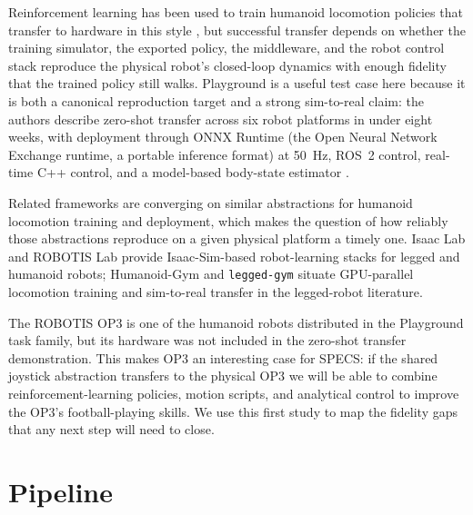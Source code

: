 Reinforcement learning has been used to train humanoid locomotion policies that
transfer to hardware in this style
\citep{Rudin2022-learning-to-walk-in-minutes-massively-parallel-deep-reinforcement-learning,Gu2024-humanoid-gym-reinforcement-learning-humanoid-robot-zero-shot-sim-to-real-transfer,Zakka2025-demonstrating-mujoco-playground},
but successful transfer depends on whether the training simulator, the exported
policy, the middleware, and the robot control stack reproduce the physical
robot's closed-loop dynamics with enough fidelity that the trained policy still
walks. Playground is a useful test case here because it is both a canonical
reproduction target and a strong sim-to-real claim: the authors describe
zero-shot transfer across six robot platforms in under eight weeks, with
deployment through ONNX Runtime (the Open Neural Network Exchange runtime, a
portable inference format) at 50~Hz, ROS~2 control, real-time C++ control, and a
model-based body-state estimator
\citep{Zakka2025-demonstrating-mujoco-playground}.

Related frameworks are converging on similar abstractions for humanoid
locomotion training and deployment, which makes the question of how reliably
those abstractions reproduce on a given physical platform a timely one. Isaac
Lab
\citep{Mittal2025-isaac-lab-gpu-accelerated-simulation-framework-multi-modal-robot-learning}
and ROBOTIS Lab
\citep{ROBOTIS2026-robotis-lab-reinforcement-learning-imitation-learning-robotis-robots}
provide Isaac-Sim-based robot-learning stacks for legged and humanoid robots;
Humanoid-Gym
\citep{Gu2024-humanoid-gym-reinforcement-learning-humanoid-robot-zero-shot-sim-to-real-transfer}
and \texttt{legged-gym}
\citep{Rudin2022-learning-to-walk-in-minutes-massively-parallel-deep-reinforcement-learning}
situate GPU-parallel locomotion training and sim-to-real transfer in the
legged-robot literature.

The ROBOTIS OP3 is one of the humanoid robots distributed in the Playground task
family, but its hardware was not included in the zero-shot transfer demonstration. This
makes OP3 an interesting case for SPECS: if the shared joystick abstraction
transfers to the physical OP3 we will be able to combine
reinforcement-learning policies, motion scripts, and analytical control to
improve the OP3's football-playing skills.  We use this first study to map
the fidelity gaps that any next step will need to close.

\section{Pipeline}

